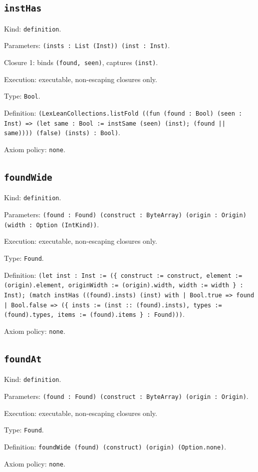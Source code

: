 \documentclass[11pt]{article}
\begin{document}
\subsection*{\texttt{instHas}}
\noindent Kind: \texttt{definition}.\par
\noindent Parameters: \texttt{(insts : List (Inst)) (inst : Inst)}.\par
\noindent Closure 1: binds \texttt{(found, seen)}, captures \texttt{(inst)}.\par
\noindent Execution: executable, non-escaping closures only.\par
\noindent Type: \texttt{Bool}.\par
\noindent Definition: \texttt{(LexLeanCollections.listFold ((fun (found : Bool) (seen : Inst) => (let same : Bool := instSame (seen) (inst); (found || same)))) (false) (insts) : Bool)}.\par
\noindent Axiom policy: \texttt{none}.\par
\subsection*{\texttt{foundWide}}
\noindent Kind: \texttt{definition}.\par
\noindent Parameters: \texttt{(found : Found) (construct : ByteArray) (origin : Origin) (width : Option (IntKind))}.\par
\noindent Execution: executable, non-escaping closures only.\par
\noindent Type: \texttt{Found}.\par
\noindent Definition: \texttt{(let inst : Inst := (\{ construct := construct, element := (origin).element, originWidth := (origin).width, width := width \} : Inst); (match instHas ((found).insts) (inst) with | Bool.true => found | Bool.false => (\{ insts := (inst :: (found).insts), types := (found).types, items := (found).items \} : Found)))}.\par
\noindent Axiom policy: \texttt{none}.\par
\subsection*{\texttt{foundAt}}
\noindent Kind: \texttt{definition}.\par
\noindent Parameters: \texttt{(found : Found) (construct : ByteArray) (origin : Origin)}.\par
\noindent Execution: executable, non-escaping closures only.\par
\noindent Type: \texttt{Found}.\par
\noindent Definition: \texttt{foundWide (found) (construct) (origin) (Option.none)}.\par
\noindent Axiom policy: \texttt{none}.\par
\end{document}
